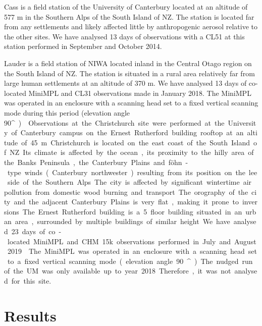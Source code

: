Cass is a field station of the University of Canterbury
located at an altitude of 577 m in the Southern Alps
of the South Island of NZ. The station is located far from any
settlements and likely affected little by anthropogenic aerosol relative to the
other sites. We have analysed
13 days of observations with a CL51 at this station performed in September
and October 2014.

Lauder is a field station of NIWA located
inland in the Central Otago region on the South Island of NZ.
The station is situated in a rural area relatively far from large human
settlements at an altitude of 370 m. We have analysed 13 days of co-located MiniMPL and CL31
observations made in January 2018. The MiniMPL was operated in an enclosure with a scanning head set to a fixed
vertical scanning mode during this period (elevation angle 90\unit{^\circ}).

Observations at the Christchurch site were performed at the
University of Canterbury campus on the Ernest Rutherford building rooftop at an altitude of 45 m.
Christchurch is located on the east coast of the South Island of NZ.
Its climate is affected by the ocean, its proximity to the hilly area
of the Banks Peninsula, the Canterbury Plains and föhn-type winds (Canterbury northwester)
resulting from its position on the lee side of the Southern Alps. The city is affected by
significant wintertime air pollution from domestic wood burning and transport.
The orography of the city and the adjacent Canterbury Plains is very flat,
making it prone to inversions. The Ernest Rutherford building is a 5 floor
building situated in an urban area, surrounded by multiple buildings of similar
height. We have analysed 23 days of co-located MiniMPL and CHM 15k observations
performed in July and August 2019. The MiniMPL was operated in an enclosure with a scanning head set to a fixed vertical
scanning mode (elevation angle 90\unit{^\circ}).
The nudged run of the UM was only available up to year 2018. Therefore,
it was not analysed for this site.

\section{Results}
\label{sec:3:results}

